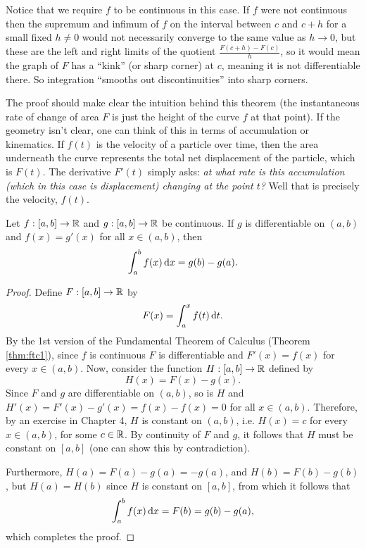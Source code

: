 \documentclass[../analysis1.tex]{subfiles}
\begin{document}
Notice that we require $f$ to be continuous in this case. If $f$ were not continuous then the supremum and infimum of $f$ on the interval between $c$ and $c+h$ for a small fixed $h\ne0 $ would not necessarily converge to the same value as $h\to 0$, but these are the left and right limits of the quotient $\frac{F(c+h)-F(c)}{h}$, so it would mean the graph of $F$ has a ``kink'' (or sharp corner) at $c$, meaning it is not differentiable there. So integration ``smooths out discontinuities'' into sharp corners.

\begin{remark}
    The proof should make clear the intuition behind this theorem (the instantaneous rate of change of area $F$ is just the height of the curve $f$ at that point). If the geometry isn't clear, one can think of this in terms of accumulation or kinematics. If $f(t)$ is the velocity of a particle over time, then the area underneath the curve represents the total net displacement of the particle, which is $F(t)$. The derivative $F'(t)$ simply asks: \textit{at what rate is this accumulation (which in this case is displacement) changing at the point $t$?} Well that is precisely the velocity, $f(t)$.
\end{remark}


\begin{corollary}
\label{cor:ftc1cor}
    \begin{shaded*}
        Let $f:[a,b]\to\mathbb{R}$ and $g:[a,b]\to\mathbb{R}$ be continuous. If $g$ is differentiable on $(a,b)$ and $f(x)=g'(x)$ for all $x\in(a,b)$, then
        \[\int_a^b f(x)\d{x}=g(b)-g(a).\]
    \end{shaded*}
\end{corollary}
\begin{proof}
    Define $F:[a,b]\to\mathbb{R}$ by \[F(x)=\int_a^x f(t)\d{t}.\]
    By the 1st version of the Fundamental Theorem of Calculus (Theorem \ref{thm:ftc1}), since $f$ is continuous $F$ is differentiable and $F'(x)=f(x)$ for every $x\in(a,b)$. Now, consider the function $H:[a,b]\to\mathbb{R}$ defined by
    \[H(x)=F(x)-g(x).\]
    Since $F$ and $g$ are differentiable on $(a,b)$, so is $H$ and $H'(x)=F'(x)-g'(x)=f(x)-f(x)=0$ for all $x\in (a,b)$. Therefore, by an exercise in Chapter 4, $H$ is constant on $(a,b)$, i.e. $H(x)=c$ for every $x\in(a,b)$, for some $c\in\mathbb{R}$. By continuity of $F$ and $g$, it follows that $H$ must be constant on $[a,b]$ (one can show this by contradiction).

    Furthermore, $H(a)=F(a)-g(a)=-g(a)$, and $H(b)=F(b)-g(b)$, but $H(a)=H(b)$ since $H$ is constant on $[a,b]$, from which it follows that
    \[\int_a^b f(x)\d{x}=F(b)=g(b)-g(a),\]
    which completes the proof.\qedhere
\end{proof}
\end{document}
